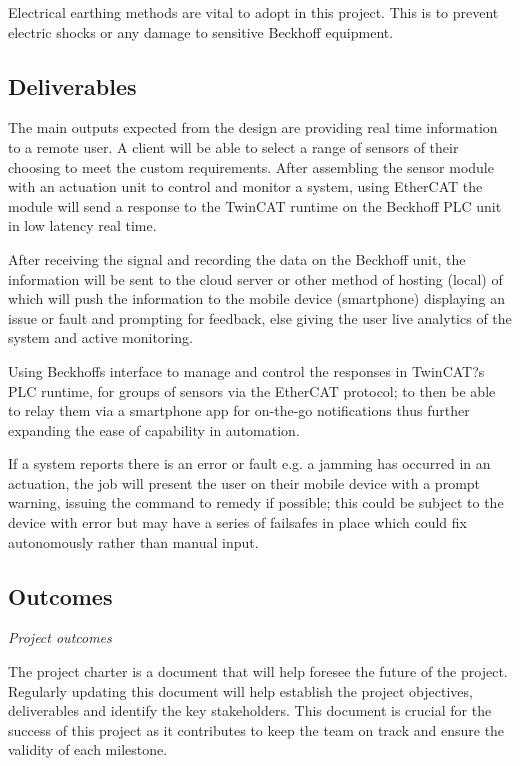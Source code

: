 \documentclass[a4paper, 10pt, conference]{IEEEconf}
\begin{document}
Electrical earthing methods are vital to adopt in this project. This is to prevent electric shocks or any damage to sensitive Beckhoff equipment. 

\subsection{Deliverables}
The main outputs expected from the design are providing real time information to a remote user. A client will be able to select a range of sensors of their choosing to meet the custom requirements. After assembling the sensor module with an actuation unit to control and monitor a system, using EtherCAT the module will send a response to the TwinCAT runtime on the Beckhoff PLC unit in low latency real time. 

After receiving the signal and recording the data on the Beckhoff unit, the information will be sent to the cloud server or other method of hosting (local) of which will push the information to the mobile device (smartphone) displaying an issue or fault and prompting for feedback, else giving the user live analytics of the system and active monitoring.

Using Beckhoffs interface to manage and control the responses in TwinCAT?s PLC runtime, for groups of sensors via the EtherCAT protocol; to then be able to relay them via a smartphone app for on-the-go notifications thus further expanding the ease of capability in automation.

If a system reports there is an error or fault e.g. a jamming has occurred in an actuation, the job will present the user on their mobile device with a prompt warning, issuing the command to remedy if possible; this could be subject to the device with error but may have a series of failsafes in place which could fix autonomously rather than manual input.

\subsection{Outcomes}

{\it Project outcomes}



The project charter is a document that will help foresee the future of the project. Regularly updating this document will help establish the project objectives, deliverables and identify the key stakeholders. This document is crucial for the success of this project as it contributes to keep the team on track and ensure the validity of each milestone. 
\end{document}
